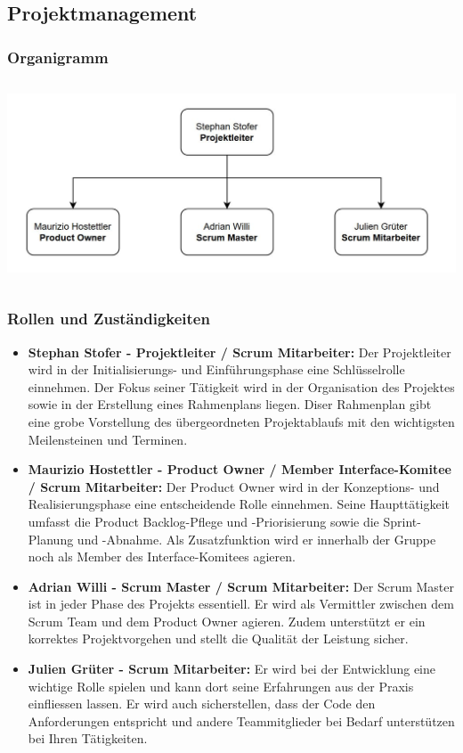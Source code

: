 \documentclass[11pt]{article}
\begin{document}
\subsection{Projektmanagement}
\subsubsection{Organigramm}
\begin{center}
	\includegraphics[height=6cm,keepaspectratio]{images/Organisation.JPG}
\end{center}

\subsubsection{Rollen und Zuständigkeiten}
\begin{itemize}
	\itemsep0pt
	\item \textbf{Stephan Stofer - Projektleiter / Scrum Mitarbeiter: }Der Projektleiter wird in der Initialisierungs- und Einführungsphase eine Schlüsselrolle einnehmen. Der Fokus seiner Tätigkeit wird in der Organisation des Projektes sowie in der Erstellung eines Rahmenplans liegen. Diser Rahmenplan gibt eine grobe Vorstellung des übergeordneten Projektablaufs mit den wichtigsten Meilensteinen und Terminen.
	\item \textbf{Maurizio Hostettler - Product Owner / Member Interface-Komitee / Scrum Mitarbeiter: }Der Product Owner wird in der Konzeptions- und Realisierungsphase eine entscheidende Rolle einnehmen. Seine Haupttätigkeit umfasst die Product Backlog-Pflege und -Priorisierung sowie die Sprint-Planung und -Abnahme. Als Zusatzfunktion wird er innerhalb der Gruppe noch als Member des Interface-Komitees agieren.
    \item \textbf{Adrian Willi - Scrum Master / Scrum Mitarbeiter: }Der Scrum Master ist in jeder Phase des Projekts essentiell. Er wird als Vermittler zwischen dem Scrum Team und dem Product Owner agieren. Zudem unterstützt er ein korrektes Projektvorgehen und stellt die Qualität der Leistung sicher.
    \item \textbf{Julien Grüter - Scrum Mitarbeiter: }Er wird bei der Entwicklung eine wichtige Rolle spielen und kann dort seine Erfahrungen aus der Praxis einfliessen lassen. Er wird auch sicherstellen, dass der Code den Anforderungen entspricht und andere Teammitglieder bei Bedarf unterstützen bei Ihren Tätigkeiten.
\end{itemize}
\end{document}
